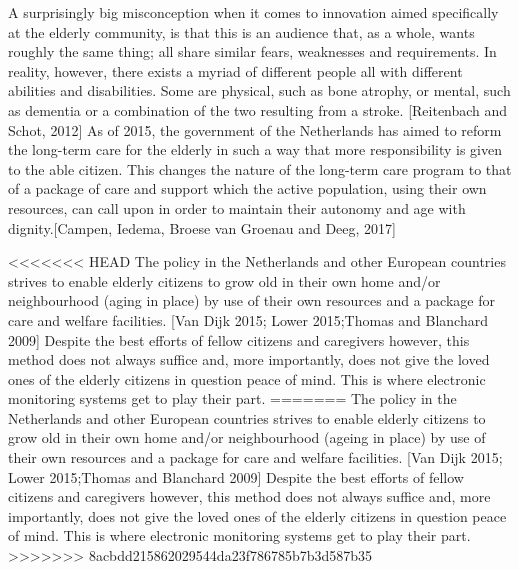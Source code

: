 \documentclass{below-ext}
\begin{document}
A surprisingly big misconception when it comes to innovation aimed specifically at the elderly community, is that this is an audience that, as a whole, wants roughly the same thing; all share similar fears, weaknesses and requirements. In reality, however, there exists a myriad of different people all with different abilities and disabilities. Some are physical, such as bone atrophy, or mental, such as dementia or a combination of the two resulting from a stroke. [Reitenbach and Schot, 2012]  As of 2015, the government of the Netherlands has aimed to reform the long-term care for the elderly in such a way that more responsibility is given to the able citizen. This changes the nature of the long-term care program to that of a package of care and support which the active population, using their own resources, can call upon in order to maintain their autonomy and age with dignity.[Campen, Iedema, Broese van Groenau and Deeg, 2017]

<<<<<<< HEAD
The policy in the Netherlands and other European countries strives to enable elderly citizens to grow old in their own home and/or neighbourhood (aging in place) by use of their own resources and a package for care and welfare facilities. [Van Dijk 2015; Lower 2015;Thomas and Blanchard 2009] Despite the best efforts of fellow citizens and caregivers however, this method does not always suffice and, more importantly, does not give the loved ones of the elderly citizens in question peace of mind. This is where electronic monitoring systems get to play their part.
=======
The policy in the Netherlands and other European countries strives to enable elderly citizens to grow old in their own home and/or neighbourhood (ageing in place) by use of their own resources and a package for care and welfare facilities. [Van Dijk 2015; Lower 2015;Thomas and Blanchard 2009] Despite the best efforts of fellow citizens and caregivers however, this method does not always suffice and, more importantly, does not give the loved ones of the elderly citizens in question peace of mind. This is where electronic monitoring systems get to play their part.
>>>>>>> 8acbdd215862029544da23f786785b7b3d587b35

\end{document}

